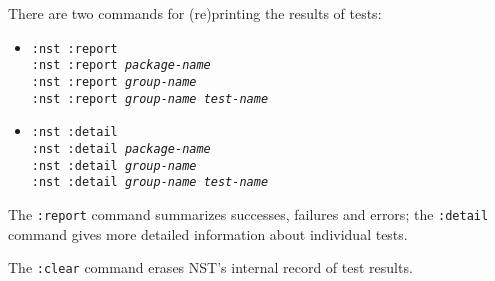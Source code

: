 There are two commands for (re)printing the results of tests:
\begin{itemize}
\item\texttt{:nst :report}
\\ \texttt{:nst :report {\itshape package-name}}
\\ \texttt{:nst :report {\itshape group-name}}
\\ \texttt{:nst :report {\itshape group-name} {\itshape test-name}}
\item\texttt{:nst :detail}
\\ \texttt{:nst :detail {\itshape package-name}}
\\ \texttt{:nst :detail {\itshape group-name}}
\\ \texttt{:nst :detail {\itshape group-name} {\itshape test-name}}
\end{itemize}
The \texttt{:report} command summarizes successes, failures and
errors; the \texttt{:detail} command gives more detailed information
about individual tests.

The \texttt{:clear} command erases NST's internal record of test
results.


